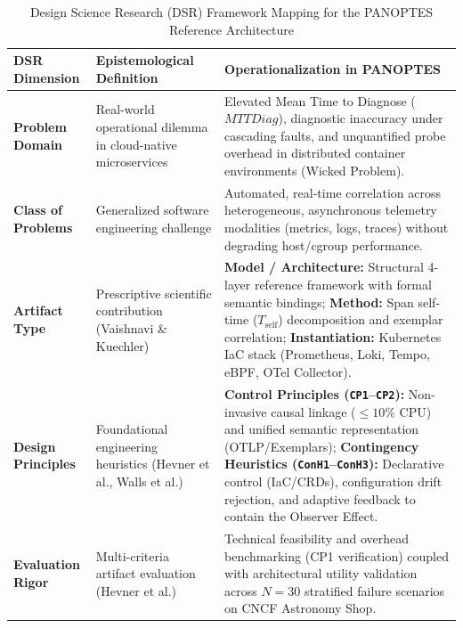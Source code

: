 \begin{table}[!htbp]
\centering
\small
\caption{Design Science Research (DSR) Framework Mapping for the PANOPTES Reference Architecture}
\label{tab:dsr_elements}
\begin{tabularx}{\textwidth}{@{}l p{4.2cm} X@{}}
\toprule
\textbf{DSR Dimension} & \textbf{Epistemological Definition} & \textbf{Operationalization in PANOPTES} \\ \midrule
\textbf{Problem Domain} & Real-world operational dilemma in cloud-native microservices & Elevated Mean Time to Diagnose ($MTTDiag$), diagnostic inaccuracy under cascading faults, and unquantified probe overhead in distributed container environments (Wicked Problem). \\ \addlinespace[2pt]
\textbf{Class of Problems} & Generalized software engineering challenge & Automated, real-time correlation across heterogeneous, asynchronous telemetry modalities (metrics, logs, traces) without degrading host/cgroup performance. \\ \addlinespace[2pt]
\textbf{Artifact Type} & Prescriptive scientific contribution (Vaishnavi \& Kuechler) & \textbf{Model / Architecture:} Structural 4-layer reference framework with formal semantic bindings; \textbf{Method:} Span self-time ($T_{\text{self}}$) decomposition and exemplar correlation; \textbf{Instantiation:} Kubernetes IaC stack (Prometheus, Loki, Tempo, eBPF, OTel Collector). \\ \addlinespace[2pt]
\textbf{Design Principles} & Foundational engineering heuristics (Hevner et al., Walls et al.) & \textbf{Control Principles (\texttt{CP1}--\texttt{CP2}):} Non-invasive causal linkage ($\le 10\%$ CPU) and unified semantic representation (OTLP/Exemplars); \textbf{Contingency Heuristics (\texttt{ConH1}--\texttt{ConH3}):} Declarative control (IaC/CRDs), configuration drift rejection, and adaptive feedback to contain the Observer Effect. \\ \addlinespace[2pt]
\textbf{Evaluation Rigor} & Multi-criteria artifact evaluation (Hevner et al.) & Technical feasibility and overhead benchmarking (CP1 verification) coupled with architectural utility validation across $N=30$ stratified failure scenarios on CNCF Astronomy Shop. \\ \bottomrule
\end{tabularx}
\end{table}
